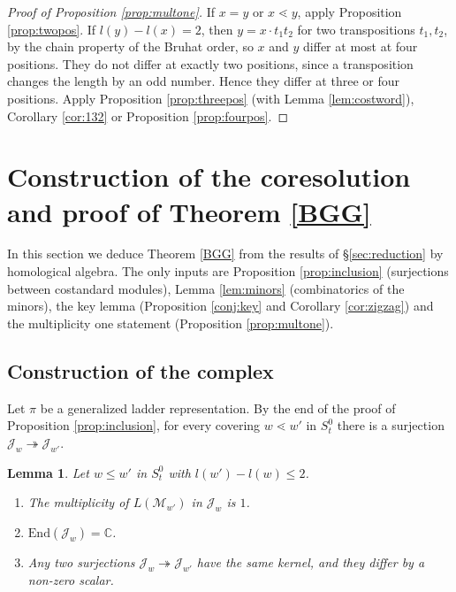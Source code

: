 \documentclass[a4paper,12pt,leqno]{amsart}
\newcommand{\bbC}{\mathbb{C}}
\newcommand{\caJ}{\mathcal{J}}
\newcommand{\caM}{\mathcal{M}}
\theoremstyle{plain}
\newtheorem{lemma}[thm]{Lemma}
\theoremstyle{definition}
\theoremstyle{definition}
\begin{document}
\begin{proof}[Proof of Proposition \ref{prop:multone}]
If $x=y$ or $x\lessdot y$, apply Proposition \ref{prop:twopos}. If $l(y)-l(x)=2$, then $y=x\cdot
t_1t_2$ for two transpositions $t_1,t_2$, by the chain property of the Bruhat order, so $x$ and $y$
differ at most at four positions. They do not differ at exactly two positions, since a
transposition changes the length by an odd number. Hence they differ at three or four positions.
Apply Proposition \ref{prop:threepos} (with Lemma \ref{lem:costword}), Corollary \ref{cor:132} or
Proposition \ref{prop:fourpos}.
\end{proof}




\section{Construction of the coresolution and proof of Theorem \ref{BGG}}\label{sec:complex}
In this section we deduce Theorem \ref{BGG} from the results of \S\ref{sec:reduction} by homological
algebra. The only inputs are Proposition \ref{prop:inclusion} (surjections between costandard
modules), Lemma \ref{lem:minors} (combinatorics of the minors), the key lemma (Proposition
\ref{conj:key} and Corollary \ref{cor:zigzag}) and the multiplicity one statement (Proposition
\ref{prop:multone}).

\subsection{Construction of the complex}\label{ssec:complex}
Let $\pi$ be a generalized ladder representation. By the end of the proof of Proposition
\ref{prop:inclusion}, for every covering
 $w\lessdot w'$ in $S_t^0$ there is a surjection $\caJ_w\twoheadrightarrow\caJ_{w'}$.

\begin{lemma}\label{lem:rigid} Let $w\leq w'$ in $S_t^0$ with $l(w')-l(w)\leq 2$.
\begin{enumerate}
\item[(i)] The multiplicity of $L(\caM_{w'})$ in $\caJ_w$ is $1$.
\item[(ii)] $\mathrm{End}(\caJ_w)=\bbC$.
\item[(iii)] Any two surjections $\caJ_w\twoheadrightarrow\caJ_{w'}$ have the same kernel, and they
differ by a non-zero scalar.
\end{enumerate}
\end{lemma}
\end{document}
